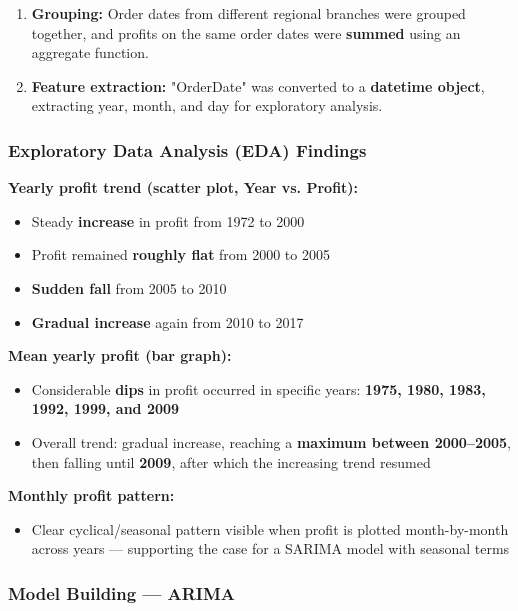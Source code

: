\documentclass[12pt,openany]{book}
\begin{document}
\begin{enumerate}[leftmargin=*]
    \item \textbf{Grouping:} Order dates from different regional branches were grouped together, and profits on the same order dates were \textbf{summed} using an aggregate function.
    \item \textbf{Feature extraction:} "OrderDate" was converted to a \textbf{datetime object}, extracting year, month, and day for exploratory analysis.
\end{enumerate}

\subsubsection{Exploratory Data Analysis (EDA) Findings}

\textbf{Yearly profit trend (scatter plot, Year vs. Profit):}
\begin{itemize}[leftmargin=*]
    \item Steady \textbf{increase} in profit from 1972 to 2000
    \item Profit remained \textbf{roughly flat} from 2000 to 2005
    \item \textbf{Sudden fall} from 2005 to 2010
    \item \textbf{Gradual increase} again from 2010 to 2017
\end{itemize}

\textbf{Mean yearly profit (bar graph):}
\begin{itemize}[leftmargin=*]
    \item Considerable \textbf{dips} in profit occurred in specific years: \textbf{1975, 1980, 1983, 1992, 1999, and 2009}
    \item Overall trend: gradual increase, reaching a \textbf{maximum between 2000--2005}, then falling until \textbf{2009}, after which the increasing trend resumed
\end{itemize}

\textbf{Monthly profit pattern:}
\begin{itemize}[leftmargin=*]
    \item Clear cyclical/seasonal pattern visible when profit is plotted month-by-month across years --- supporting the case for a SARIMA model with seasonal terms
\end{itemize}

\subsubsection{Model Building --- ARIMA}
\end{document}
